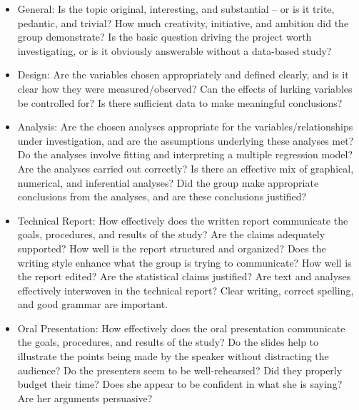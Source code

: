 \documentclass[10pt]{article}
\begin{document}
	\begin{itemize}
		\item General: Is the topic original, interesting, and substantial -- or is it trite, pedantic, and trivial?  How much creativity, initiative, and ambition did the group demonstrate?  Is the basic question driving the project worth investigating, or is it obviously answerable without a data-based study?
		\item Design:  Are the variables chosen appropriately and defined clearly, and is it clear how they were measured/observed?  Can the effects of lurking variables be controlled for?  Is there sufficient data to make meaningful conclusions? 
		\item Analysis:  Are the chosen analyses appropriate for the variables/relationships under investigation, and are the assumptions underlying these analyses met?  Do the analyses involve fitting and interpreting a multiple regression model?  Are the analyses carried out correctly?  Is there an effective mix of graphical, numerical, and inferential analyses?  Did the group make appropriate conclusions from the analyses, and are these conclusions justified?
		\item Technical Report:  How effectively does the written report communicate the goals, procedures, and results of the study?  Are the claims adequately supported? How well is the report structured and organized? Does the writing style enhance what the group is trying to communicate?  How well is the report edited? Are the statistical claims justified? Are text and analyses effectively interwoven in the technical report? Clear writing, correct spelling, and good grammar are important.
		\item Oral Presentation: How effectively does the oral presentation communicate the goals, procedures, and results of the study? Do the slides help to illustrate the points being made by the speaker without distracting the audience? Do the presenters seem to be well-rehearsed? Did they properly budget their time? Does she appear to be confident in what she is saying? Are her arguments persuasive? 
	\end{itemize}
\end{document}
